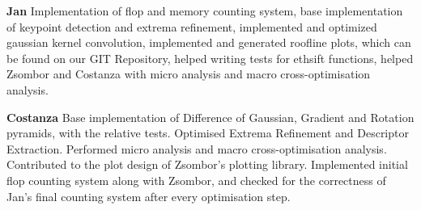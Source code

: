 \documentclass[letterpaper]{article}
\begin{document}
\textbf{Jan} Implementation of flop and memory counting system, base implementation of keypoint detection and extrema refinement, implemented and optimized gaussian kernel convolution, implemented and generated roofline plots, which can be found on our GIT Repository, helped writing tests for ethsift functions, helped Zsombor and Costanza with micro analysis and macro cross-optimisation analysis.
 
\textbf{Costanza} Base implementation of Difference of Gaussian, Gradient and Rotation pyramids, with the relative tests. Optimised Extrema Refinement and Descriptor Extraction. Performed micro analysis and macro cross-optimisation analysis. Contributed to the plot design of Zsombor's plotting library. Implemented initial flop counting system along with Zsombor, and checked for the correctness of Jan's final counting system after every optimisation step. 


\end{document}
